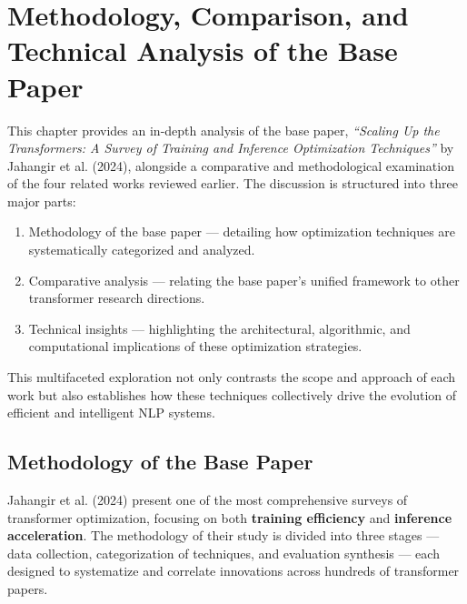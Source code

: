 \chapter{Methodology, Comparison, and Technical Analysis of the Base Paper}
\label{chap:comparison}

This chapter provides an in-depth analysis of the base paper, \textit{“Scaling Up the Transformers: A Survey of Training and Inference Optimization Techniques”} by Jahangir et al. (2024), alongside a comparative and methodological examination of the four related works reviewed earlier.  
The discussion is structured into three major parts:
\begin{enumerate}
    \item Methodology of the base paper — detailing how optimization techniques are systematically categorized and analyzed.
    \item Comparative analysis — relating the base paper’s unified framework to other transformer research directions.
    \item Technical insights — highlighting the architectural, algorithmic, and computational implications of these optimization strategies.
\end{enumerate}

This multifaceted exploration not only contrasts the scope and approach of each work but also establishes how these techniques collectively drive the evolution of efficient and intelligent NLP systems.

\newpage

\section{Methodology of the Base Paper}

Jahangir et al. (2024) present one of the most comprehensive surveys of transformer optimization, focusing on both \textbf{training efficiency} and \textbf{inference acceleration}.  
The methodology of their study is divided into three stages — data collection, categorization of techniques, and evaluation synthesis — each designed to systematize and correlate innovations across hundreds of transformer papers.

